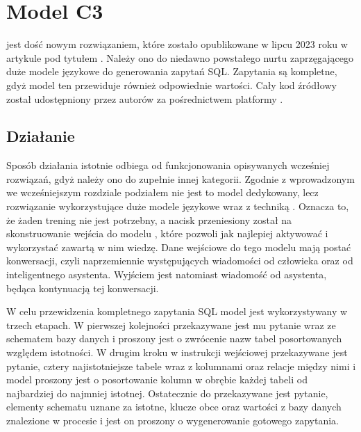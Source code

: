 \section{Model C3}
 jest dość nowym rozwiązaniem, które zostało opublikowane w lipcu 2023 roku w artykule pod tytułem  . Należy ono do niedawno powstałego nurtu zaprzęgającego duże modele językowe do generowania zapytań SQL. Zapytania są kompletne, gdyż model ten przewiduje również odpowiednie wartości. Cały kod źródłowy  został udostępniony przez autorów za pośrednictwem platformy  . 

\subsection{Działanie}
Sposób działania  istotnie odbiega od funkcjonowania opisywanych wcześniej rozwiązań, gdyż należy ono do zupełnie innej kategorii. Zgodnie z wprowadzonym we wcześniejszym rozdziale podziałem nie jest to model dedykowany, lecz rozwiązanie wykorzystujące duże modele językowe wraz z techniką . Oznacza to, że żaden trening nie jest potrzebny, a nacisk przeniesiony został na skonstruowanie wejścia do modelu , które pozwoli jak najlepiej aktywować i wykorzystać zawartą w nim wiedzę. Dane wejściowe do tego modelu mają postać konwersacji, czyli naprzemiennie występujących wiadomości od człowieka oraz od inteligentnego asystenta. Wyjściem jest natomiast wiadomość od asystenta, będąca kontynuacją tej konwersacji.

W celu przewidzenia kompletnego zapytania SQL model  jest wykorzystywany w trzech etapach. W pierwszej kolejności przekazywane jest mu pytanie wraz ze schematem bazy danych i proszony jest o zwrócenie nazw tabel posortowanych względem istotności. W drugim kroku w instrukcji wejściowej przekazywane jest pytanie, cztery najistotniejsze tabele wraz z kolumnami oraz relacje między nimi i model proszony jest o posortowanie kolumn w obrębie każdej tabeli od najbardziej do najmniej istotnej. Ostatecznie do  przekazywane jest pytanie, elementy schematu uznane za istotne, klucze obce oraz wartości z bazy danych znalezione w procesie  i jest on proszony o wygenerowanie gotowego zapytania.

